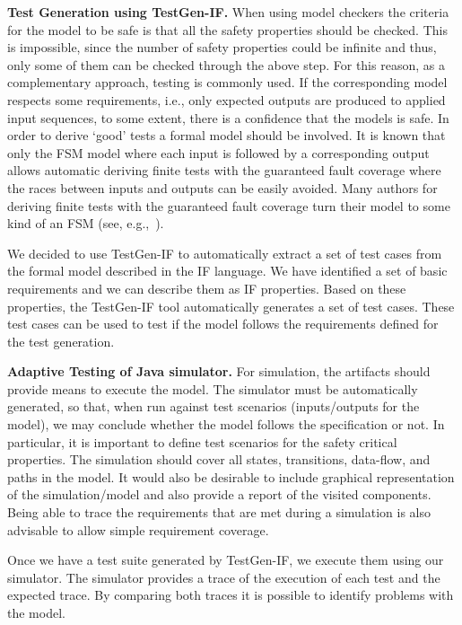 \documentclass{template/openetcs_article}
\begin{document}
\textbf{Test Generation using TestGen-IF.}
When using model checkers the criteria for the model to be safe is that all the
safety properties should be checked. This is impossible, since the number of
safety properties could be infinite and thus, only some of them can be checked
through the above step.
For this reason, as a complementary approach, testing is commonly used. If the
corresponding model respects some requirements, i.e., only expected outputs are
produced to applied input sequences, to some extent, there is a confidence that
the models is safe. In order to derive ‘good’ tests a formal model should be
involved. It is known that only the FSM model where each input is followed by a
corresponding output allows automatic deriving finite tests with the guaranteed
fault coverage where the races between inputs and outputs can be easily avoided.
 Many authors for deriving finite tests with the guaranteed fault coverage turn
their model to some kind of an FSM (see,
e.g.,~\cite{springintveld2001testing,zymc11,Gromov2009}).

We decided to use TestGen-IF to automatically extract a set of test cases from
the formal model described in the IF language. We have identified a set of basic
requirements and we can describe them as IF properties.  Based on these
properties, the TestGen-IF tool automatically generates a set of test cases.
These test cases can be used to test if the model follows the requirements defined for the test generation.

\textbf{Adaptive Testing of Java simulator.}
For simulation, the artifacts should provide means to execute the model.  The
simulator must be automatically generated, so that, when run against test
scenarios (inputs/outputs for the model), we may conclude whether the model
follows the specification or not. In particular, it is important to define test
scenarios for the safety critical properties. The simulation should cover all states,
transitions, data-flow, and paths in the model. It would also be desirable to
include graphical representation of the simulation/model and also provide a
report of the visited components. Being able to trace the
requirements that are met during a simulation is also advisable to allow simple
requirement coverage.

Once we have a test suite generated by TestGen-IF, we execute them using our simulator. The simulator provides a trace of the execution of each test and the expected trace. By comparing both traces it is possible to identify problems with the model.
\end{document}
